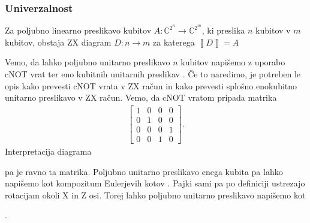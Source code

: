 \documentclass[mat1]{fmfdelo}
\newcommand{\C}{\mathbb C}
\newcommand{\interpret}[1]{\left\llbracket #1 \right\rrbracket}
\begin{document}
\subsubsection{Univerzalnost}
\begin{izrek}[Univerzalnost]
    Za poljubno linearno preslikavo kubitov \(A:\C^{2^n}\to \C^{2^m}\), ki preslika \(n\) kubitov v \(m\) kubitov, obstaja ZX diagram \(D:n\to m\) za katerega \(\interpret{D}=A\)
\end{izrek}
\proof
Vemo, da lahko poljubno unitarno preslikavo \(n\) kubitov napišemo z uporabo cNOT vrat ter eno kubitnih unitarnih preslikav \cite[Izrek 5.26]{mathforqm}. Če to naredimo, je potreben le opis kako prevesti cNOT vrata v ZX račun in kako prevesti splošno enokubitno unitarno preslikavo v ZX račun. Vemo, da cNOT vratom pripada matrika
\begin{align*}
    \begin{bmatrix}
        1&0&0&0\\
        0&1&0&0\\
        0&0&0&1\\
        0&0&1&0
    \end{bmatrix}.
\end{align*}
Interpretacija diagrama
\begin{center}
\end{center}
pa je ravno ta matrika. Poljubno unitarno preslikavo enega kubita pa lahko napišemo kot kompozitum Eulerjevih kotov \cite[Izrek 5.11]{mathforqm}. Pajki sami pa po definiciji ustrezajo rotacijam okoli X in Z osi. Torej lahko poljubno unitarno preslikavo napišemo kot
\begin{center}
    .
\end{center}
\end{document}
